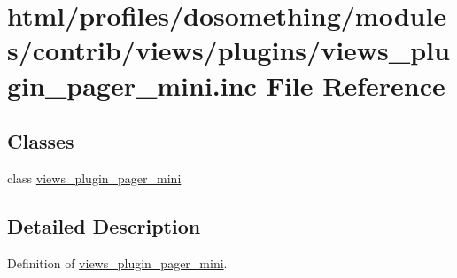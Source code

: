 \hypertarget{views__plugin__pager__mini_8inc}{
\section{html/profiles/dosomething/modules/contrib/views/plugins/views\_\-plugin\_\-pager\_\-mini.inc File Reference}
\label{views__plugin__pager__mini_8inc}
}
\subsection*{Classes}
\begin{DoxyCompactItemize}
\item 
class \hyperlink{classviews__plugin__pager__mini}{views\_\-plugin\_\-pager\_\-mini}
\end{DoxyCompactItemize}


\subsection{Detailed Description}
Definition of \hyperlink{classviews__plugin__pager__mini}{views\_\-plugin\_\-pager\_\-mini}. 